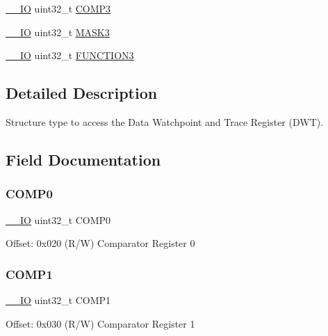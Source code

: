 \begin{DoxyCompactItemize}
\item 
\mbox{\hyperlink{core__sc300_8h_aec43007d9998a0a0e01faede4133d6be}{\+\_\+\+\_\+\+IO}} uint32\+\_\+t \mbox{\hyperlink{struct_d_w_t___type_a923d50abd92dbc50ef2983770489eafd}{C\+O\+M\+P3}}
\item 
\mbox{\hyperlink{core__sc300_8h_aec43007d9998a0a0e01faede4133d6be}{\+\_\+\+\_\+\+IO}} uint32\+\_\+t \mbox{\hyperlink{struct_d_w_t___type_a541b20e412d5586312fa4dac4a151660}{M\+A\+S\+K3}}
\item 
\mbox{\hyperlink{core__sc300_8h_aec43007d9998a0a0e01faede4133d6be}{\+\_\+\+\_\+\+IO}} uint32\+\_\+t \mbox{\hyperlink{struct_d_w_t___type_ad3bf90012b7b60cd030c54ed0ec0442d}{F\+U\+N\+C\+T\+I\+O\+N3}}
\end{DoxyCompactItemize}


\subsection{Detailed Description}
Structure type to access the Data Watchpoint and Trace Register (D\+WT). 

\subsection{Field Documentation}
\mbox{\label{struct_d_w_t___type_a00be2e0bf3e38ab6f33f8349d9e7a200}} 
\subsubsection{\texorpdfstring{COMP0}{COMP0}}
{\footnotesize\ttfamily \mbox{\hyperlink{core__sc300_8h_aec43007d9998a0a0e01faede4133d6be}{\+\_\+\+\_\+\+IO}} uint32\+\_\+t C\+O\+M\+P0}

Offset\+: 0x020 (R/W) Comparator Register 0 \mbox{\label{struct_d_w_t___type_a711f336367372393a5f874e5c46e2b95}} 
\subsubsection{\texorpdfstring{COMP1}{COMP1}}
{\footnotesize\ttfamily \mbox{\hyperlink{core__sc300_8h_aec43007d9998a0a0e01faede4133d6be}{\+\_\+\+\_\+\+IO}} uint32\+\_\+t C\+O\+M\+P1}

Offset\+: 0x030 (R/W) Comparator Register 1 \mbox{\label{struct_d_w_t___type_a5f159cd97def70baad2faa8d250bb86a}} 
